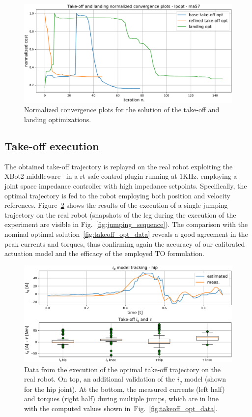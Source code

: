 \begin{figure}[t]
	\centering
	\includegraphics[width=1\columnwidth]{images/solver_conv_plots.pdf}
	\caption{Normalized convergence plots for the solution of the take-off and landing optimizations.}
	\label{fig:convergence_plots}
\end{figure}
\subsection{Take-off execution}
The obtained take-off trajectory is replayed on the real robot exploiting the XBot2 middleware~\cite{xbot::LAURENZI2023104379} in a rt-safe control plugin running at $1\mathrm{KHz}$. employing a joint space impedance controller with high impedance setpoints. Specifically, the optimal trajectory is fed to the robot employing both position and velocity references. Figure~\ref{fig:takeoff_execution} shows the results of the execution of a single jumping trajectory on the real robot (snapshots of the leg during the execution of the experiment are visible in Fig.~\ref{fig:jumping_sequence}). The comparison with the nominal optimal solution~\ref{fig:takeoff_opt_data} reveals a good agreement in the peak currents and torques, thus confirming again the accuracy of our calibrated actuation model and the efficacy of the employed TO formulation.
\begin{figure}[h]
	\centering
	\includegraphics[width=1\columnwidth]{images/hardware_saturation.pdf}
	\caption{Data from the execution of the optimal take-off trajectory on the real robot. On top, an additional validation of the $i_q$ model (shown for the hip joint). At the bottom, the measured currents (left half) and torques (right half) during multiple jumps, which are in line with the computed values shown in~Fig.~\ref{fig:takeoff_opt_data}.}
	\label{fig:takeoff_execution}
\end{figure}
